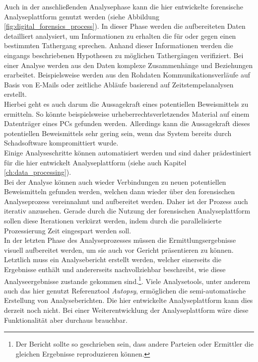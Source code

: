 \noindent
Auch in der anschließenden Analysephase kann die hier entwickelte forensische Analyseplattform genutzt werden (siehe Abbildung \ref{fig:digital_forensics_process}). In dieser Phase werden die aufbereiteten Daten detailliert analysiert, um Informationen zu erhalten die für oder gegen einen bestimmten Tathergang sprechen.\cite[S. 39-45]{digital_forensics} Anhand dieser Informationen werden die eingangs beschriebenen Hypothesen zu möglichen Tathergängen verifiziert. Bei einer Analyse werden aus den Daten komplexe Zusammenhänge und Beziehungen erarbeitet. Beispielsweise werden aus den Rohdaten Kommunikationsverläufe auf Basis von E-Mails oder zeitliche Abläufe basierend auf Zeitstempelanalysen erstellt.\cite[S. 33-39]{digital_forensics}\\
Hierbei geht es auch darum die Aussagekraft eines potentiellen Beweismittels zu ermitteln. So könnte beispielsweise urheberrechtsverletzendes Material auf einem Datenträger eines PCs gefunden werden. Allerdings kann die Aussagekraft dieses potentiellen Beweismittels sehr gering sein, wenn das System bereits durch Schadsoftware kompromittiert wurde.\\
Einige Analyseschritte können automatisiert werden und sind daher prädestiniert für die hier entwickelt Analyseplattform (siehe auch Kapitel \ref{ch:data_processing}).\\

\noindent
Bei der Analyse können auch wieder Verbindungen zu neuen potentiellen Beweismitteln gefunden werden, welchen dann wieder über den forensischen Analyseprozess vereinnahmt und aufbereitet werden. Daher ist der Prozess auch iterativ anzusehen. Gerade durch die Nutzung der forensischen Analyseplattform sollen diese Iterationen verkürzt werden, indem durch die parallelisierte Prozessierung Zeit eingespart werden soll.\\

\noindent
In der letzten Phase des Analyseprozesses müssen die Ermittlungsergebnisse visuell aufbereitet werden, um sie auch vor Gericht präsentieren zu können. Letztlich muss ein Analysebericht erstellt werden, welcher einerseits die Ergebnisse enthält und andererseits nachvollziehbar beschreibt, wie diese Analyseergebnisse zustande gekommen sind.\footnote{Der Bericht sollte so geschrieben sein, dass andere Parteien oder Ermittler die gleichen Ergebnisse reproduzieren können.}\cite[S. 45-47]{digital_forensics}. Viele Analysetools, unter anderem auch das hier genutzt Referenztool \textit{Autopsy}, ermöglichen die semi-automatische Erstellung von Analyseberichten. Die hier entwickelte Analyseplattform kann dies derzeit noch nicht. Bei einer Weiterentwicklung der Analyseplattform wäre diese Funktionalität aber durchaus brauchbar.\\

